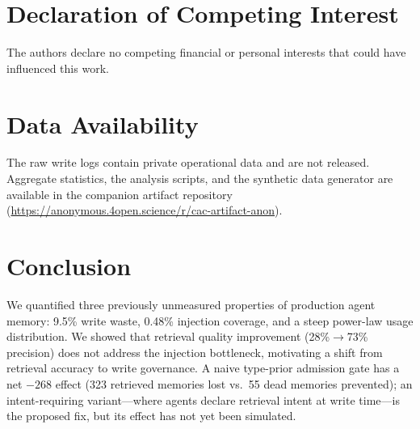 \documentclass[10pt,twocolumn]{article}
\begin{document}
\section*{Declaration of Competing Interest}
The authors declare no competing financial or personal interests that could have influenced this work.

\section*{Data Availability}
The raw write logs contain private operational data and are not released. Aggregate statistics, the analysis scripts, and the synthetic data generator are available in the companion artifact repository (\url{https://anonymous.4open.science/r/cac-artifact-anon}).

\section{Conclusion}

We quantified three previously unmeasured properties of production agent memory: 9.5\% write waste, 0.48\% injection coverage, and a steep power-law usage distribution. We showed that retrieval quality improvement (28\%$\to$73\% precision) does not address the injection bottleneck, motivating a shift from retrieval accuracy to write governance. A naive type-prior admission gate has a net $-268$ effect (323 retrieved memories lost vs.\ 55 dead memories prevented); an intent-requiring variant---where agents declare retrieval intent at write time---is the proposed fix, but its effect has not yet been simulated.
\end{document}
